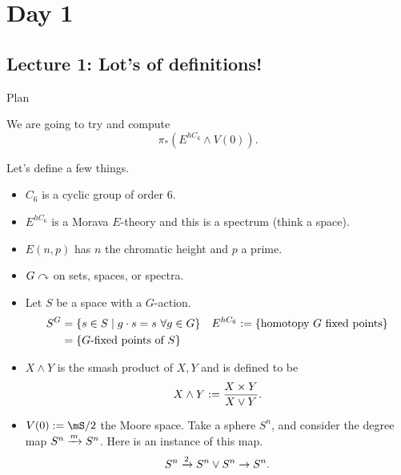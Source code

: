\section{Day 1}

\subsection{Lecture 1: Lot's of definitions!}
\begin{tcolorbox}[colback = black,coltext = white]{Plan}{}

    We are going to try and compute $$\pi_\ast(E^{hC_6}\wedge V(0)).$$
\end{tcolorbox}
Let's define a few things. 
\begin{itemize}
    \item $C_6$ is a cyclic group of order 6.
    \item $E^{hC_6}$ is a Morava $E$-theory and this is a spectrum (think a space).
    \item $E(n,p)$ has $n$ the {chromatic height} and $p$ a {prime}.
    \item $G\curvearrowright$ on sets, spaces, or spectra. 
    \item Let $S$ be a space with a $G$-action. 
    \begin{align*}
        S^G&=\left\{ s\in S\mid g\cdot s = s~\forall g\in G \right\}& E^{hC_6}&:=\left\{ \text{homotopy $G$ fixed points} \right\}\\
        & = \left\{ G\text{-fixed points of }S \right\}
    \end{align*}
    \item $X\wedge Y$ is the {smash product} of $X,Y$ and is defined to be $$X\wedge Y:= \frac{X\times Y}{X\vee Y}.$$
    \item $V(0):=\mS/2$ the {Moore space}. Take a sphere $S^n$, and consider the degree map $S^n\xrightarrow{m}S^n$. Here is an instance of this map. $$S^n\xrightarrow{2}S^n\vee S^n\to S^n.$$ 
    \begin{center}
\end{center}
\end{itemize}
